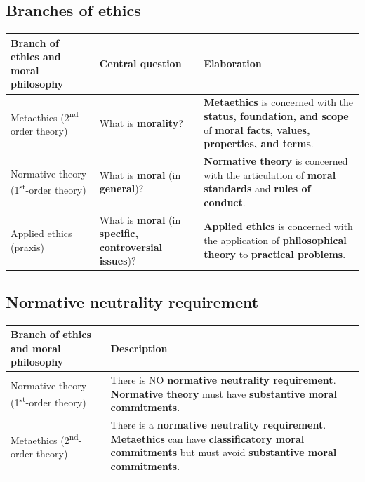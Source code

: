 \documentclass[11pt]{article}
\begin{document}
\subsection{Branches of ethics}
\label{sec:org86b7404}
\begin{center}
\begin{tabularx}{\textwidth}{|X|X|X|}
\hline
Branch of ethics and moral philosophy & Central question & Elaboration\\
\hline
Metaethics (2\textsuperscript{nd}-order theory) & What is \textbf{morality}? & \textbf{Metaethics} is concerned with the \textbf{status, foundation, and scope} of \textbf{moral facts, values, properties, and terms}.\\
\hline
Normative theory (1\textsuperscript{st}-order theory) & What is \textbf{moral} (in \textbf{general})? & \textbf{Normative theory} is concerned with the articulation of \textbf{moral standards} and \textbf{rules of conduct}.\\
\hline
Applied ethics (praxis) & What is \textbf{moral} (in \textbf{specific, controversial issues})? & \textbf{Applied ethics} is concerned with the application of \textbf{philosophical theory} to \textbf{practical problems}.\\
\hline
\end{tabularx}
\end{center}
\subsection{Normative neutrality requirement}
\label{sec:org5e1b4b9}
\begin{center}
\begin{tabularx}{\textwidth}{|X|X|}
\hline
Branch of ethics and moral philosophy & Description\\
\hline
Normative theory (1\textsuperscript{st}-order theory) & There is NO \textbf{normative neutrality requirement}. \textbf{Normative theory} must have \textbf{substantive moral commitments}.\\
\hline
Metaethics (2\textsuperscript{nd}-order theory) & There is a \textbf{normative neutrality requirement}. \textbf{Metaethics} can have \textbf{classificatory moral commitments} but must avoid \textbf{substantive moral commitments}.\\
\hline
\end{tabularx}
\end{center}
 \newpage
\end{document}
